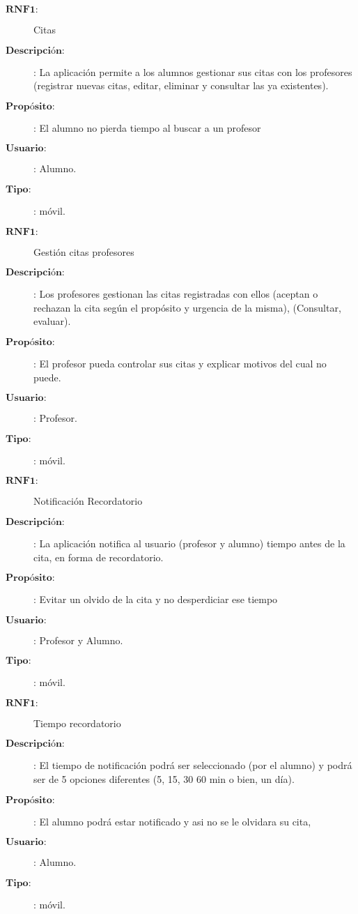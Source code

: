 \begin{description}
\item[$\textbf{RNF1:}$] Citas  
\item[$\textbf{Descripción:}$]: La aplicación permite a los alumnos gestionar sus citas con los profesores (registrar nuevas citas, editar, eliminar y consultar las ya existentes). 
\item[$\textbf{Propósito:}$]: El alumno no pierda tiempo al buscar a un profesor
\item[$\textbf{Usuario:}$]: Alumno.
\item[$\textbf{Tipo:}$]: móvil. \\

\item[$\textbf{RNF1:}$] Gestión citas profesores  
\item[$\textbf{Descripción:}$]: Los profesores gestionan las citas registradas con ellos (aceptan o rechazan la cita según el propósito y urgencia de la misma), (Consultar, evaluar). 
\item[$\textbf{Propósito:}$]: El profesor pueda controlar sus citas y explicar motivos del cual no puede.
\item[$\textbf{Usuario:}$]: Profesor.
\item[$\textbf{Tipo:}$]: móvil. \\

\item[$\textbf{RNF1:}$] Notificación Recordatorio 
\item[$\textbf{Descripción:}$]: La aplicación notifica al usuario (profesor y alumno) tiempo antes de la cita, en forma de recordatorio.
\item[$\textbf{Propósito:}$]: Evitar un olvido de la cita y no desperdiciar ese tiempo
\item[$\textbf{Usuario:}$]: Profesor y Alumno. 
\item[$\textbf{Tipo:}$]: móvil. \\

\item[$\textbf{RNF1:}$] Tiempo recordatorio
\item[$\textbf{Descripción:}$]: El tiempo de notificación podrá ser seleccionado (por el alumno) y podrá ser de 5 opciones diferentes (5, 15, 30 60 min o bien, un día).
\item[$\textbf{Propósito:}$]: El alumno podrá estar notificado y asi no se le olvidara su cita,
\item[$\textbf{Usuario:}$]: Alumno.
\item[$\textbf{Tipo:}$]: móvil. \\


\end{description}
